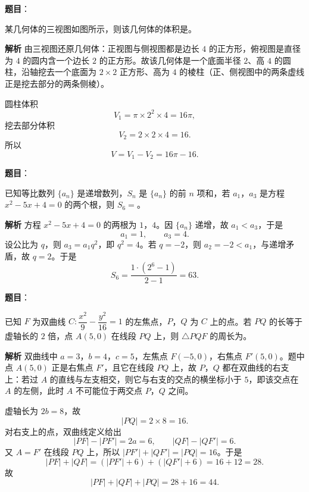 \begin{answer}

\textbf{题目}：

某几何体的三视图如图所示，则该几何体的体积是\gkblank{}。
\nopagebreak[4]
\begin{center}\end{center}
\nopagebreak[4]
\textbf{解析}
由三视图还原几何体：正视图与侧视图都是边长 $4$ 的正方形，俯视图是直径为 $4$ 的圆内含一个边长 $2$ 的正方形。故该几何体是一个底面半径 $2$、高 $4$ 的圆柱，沿轴挖去一个底面为 $2\times2$ 正方形、高为 $4$ 的棱柱（正、侧视图中的两条虚线正是挖去部分的两条侧棱）。

圆柱体积
\nopagebreak[4]
\[V_1=\pi\times2^2\times4=16\pi,\]
挖去部分体积
\nopagebreak[4]
\[V_2=2\times2\times4=16.\]
所以
\nopagebreak[4]
\[V=V_1-V_2=16\pi-16.\]


\end{answer}
\begin{answer}

\textbf{题目}：

已知等比数列 $\{a_n\}$ 是递增数列，$S_n$ 是 $\{a_n\}$ 的前 $n$ 项和，若 $a_1$，$a_3$ 是方程 $x^2-5x+4=0$ 的两个根，则 $S_6=$\gkblank{}。

\textbf{解析}
方程 $x^2-5x+4=0$ 的两根为 $1$，$4$。因 $\{a_n\}$ 递增，故 $a_1<a_3$，于是
\nopagebreak[4]
\[a_1=1,\qquad a_3=4.\]
设公比为 $q$，则 $a_3=a_1q^2$，即 $q^2=4$。若 $q=-2$，则 $a_2=-2<a_1$，与递增矛盾，故 $q=2$。于是
\nopagebreak[4]
\[S_6=\frac{1\cdot(2^6-1)}{2-1}=63.\]


\end{answer}
\begin{answer}

\textbf{题目}：

已知 $F$ 为双曲线 $C:\dfrac{x^2}{9}-\dfrac{y^2}{16}=1$ 的左焦点，$P$，$Q$ 为 $C$ 上的点。若 $PQ$ 的长等于虚轴长的 $2$ 倍，点 $A(5,0)$ 在线段 $PQ$ 上，则 $\triangle PQF$ 的周长为\gkblank{}。

\textbf{解析}
双曲线中 $a=3$，$b=4$，$c=5$，左焦点 $F(-5,0)$，右焦点 $F'(5,0)$。题中点 $A(5,0)$ 正是右焦点 $F'$，且它在线段 $PQ$ 上，故 $P$，$Q$ 都在双曲线的右支上：若过 $A$ 的直线与左支相交，则它与右支的交点的横坐标小于 $5$，即该交点在 $A$ 的左侧，此时 $A$ 不可能位于两交点 $P$，$Q$ 之间。

虚轴长为 $2b=8$，故
\nopagebreak[4]
\[|PQ|=2\times8=16.\]
对右支上的点，双曲线定义给出
\nopagebreak[4]
\[|PF|-|PF'|=2a=6,\qquad |QF|-|QF'|=6.\]
又 $A=F'$ 在线段 $PQ$ 上，所以 $|PF'|+|QF'|=|PQ|=16$。于是
\nopagebreak[4]
\[|PF|+|QF|=\left(|PF'|+6\right)+\left(|QF'|+6\right)=16+12=28.\]
故
\nopagebreak[4]
\[|PF|+|QF|+|PQ|=28+16=44.\]


\end{answer}

